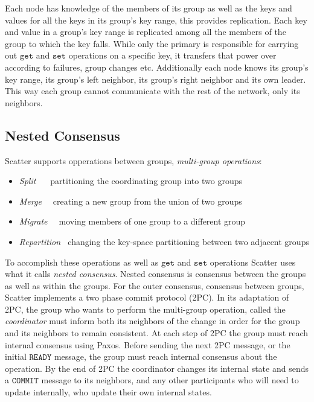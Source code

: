 \documentclass{amsart}
\theoremstyle{definition}
\theoremstyle{remark}
\numberwithin{equation}{section}
\begin{document}
Each node has knowledge of the members of its group as well as the keys and values for all the keys in its group's key range, this provides replication. Each key and value in a group's key range is replicated among all the members of the group to which the key falls. While only the primary is responsible for carrying out $\mathtt{get}$ and $\mathtt{set}$ operations on a specific key, it transfers that power over according to failures, group changes etc.  Additionally each node knows its group's key range, its group's left neighbor, its group's right neighbor and its own leader. This way each group cannot communicate with the rest of the network, only its neighbors.

\subsection{Nested Consensus}
Scatter supports opperations between groups, \textit{multi-group operations}:
\begin{itemize}
\item \textit{Split \ \ } partitioning the coordinating group into two groups
\item \textit{Merge\ \ } creating a new group from the union of two groups
\item \textit{Migrate\ \ } moving members of one group to a different group
\item \textit{Repartition \ }changing the key-space partitioning between two adjacent groups
\end{itemize}
To accomplish these operations as well as $\mathtt{get}$ and $\mathtt{set}$ operations Scatter uses what it calls \textit{nested consensus}. Nested consensus is consensus between the groups as well as within the groups. For the outer consensus, consensus between groups, Scatter implements a two phase commit protocol (2PC). In its adaptation of 2PC, the group who wants to perform the multi-group operation, called the \textit{coordinator} must inform both its neighbors of the change in order for the group and its neighbors to remain consistent. At each step of 2PC the group must reach internal consensus using Paxos. Before sending the next 2PC message, or the initial $\mathtt{READY}$ message, the group must reach internal consensus about the operation. By the end of 2PC the coordinator changes its internal state and sends a $\mathtt{COMMIT}$ message to its neighbors, and any other participants who will need to update internally, who update their own internal states. 
\end{document}

